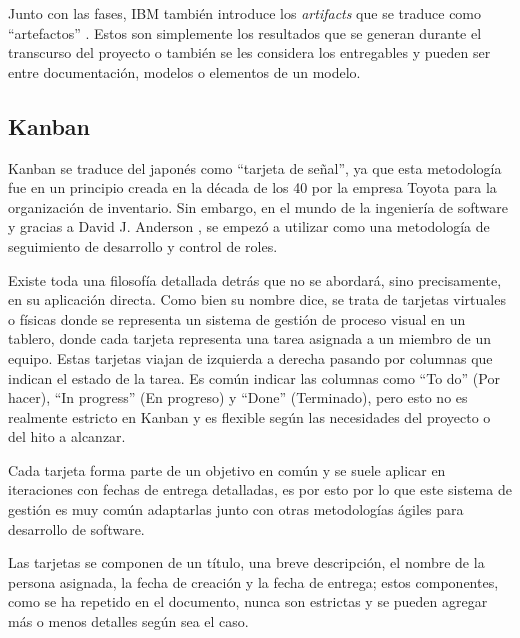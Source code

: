 Junto con las fases, IBM también introduce los \textit{artifacts} que se traduce como “artefactos” \autocite{anderson2003}. Estos son simplemente los resultados que se generan durante el transcurso del proyecto o también se les considera los entregables y pueden ser entre documentación, modelos o elementos de un modelo.

\subsection{Kanban}

Kanban se traduce del japonés como “tarjeta de señal”, ya que esta metodología fue en un principio creada en la década de los 40 por la empresa Toyota para la organización de inventario. Sin embargo, en el mundo de la ingeniería de software y gracias a David J. Anderson \autocite{anderson2003}, se empezó a utilizar como una metodología de seguimiento de desarrollo y control de roles.

Existe toda una filosofía detallada detrás que no se abordará, sino precisamente, en su aplicación directa. Como bien su nombre dice, se trata de tarjetas virtuales o físicas donde se representa un sistema de gestión de proceso visual en un tablero, donde cada tarjeta representa una tarea asignada a un miembro de un equipo. Estas tarjetas viajan de izquierda a derecha pasando por columnas que indican el estado de la tarea. Es común indicar las columnas como “To do” (Por hacer), “In progress” (En progreso) y “Done” (Terminado), pero esto no es realmente estricto en Kanban y es flexible según las necesidades del proyecto o del hito a alcanzar.

Cada tarjeta forma parte de un objetivo en común y se suele aplicar en iteraciones con fechas de entrega detalladas, es por esto por lo que este sistema de gestión es muy común adaptarlas junto con otras metodologías ágiles para desarrollo de software.

Las tarjetas se componen de un título, una breve descripción, el nombre de la persona asignada, la fecha de creación y la fecha de entrega; estos componentes, como se ha repetido en el documento, nunca son estrictas y se pueden agregar más o menos detalles según sea el caso.
